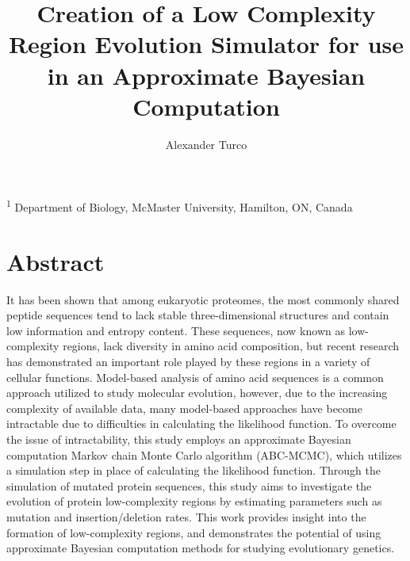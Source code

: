 \documentclass{article}
\title{\sc Creation of a Low Complexity Region Evolution Simulator for use in an Approximate Bayesian Computation}
\author{\sc Alexander Turco}
\begin{document}

\onecolumn
                        \maketitle

\thispagestyle{empty}
\noindent \textsuperscript{1} Department of Biology, McMaster University, Hamilton, ON, Canada

\newpage
\tableofcontents
\newpage
       
\section{Abstract} 

It has been shown that among eukaryotic proteomes, the most commonly shared peptide sequences tend to lack stable three-dimensional structures and contain low information and entropy content. These sequences, now known as low-complexity regions, lack diversity in amino acid composition, but recent research has demonstrated an important role played by these regions in a variety of cellular functions. Model-based analysis of amino acid sequences is a common approach utilized to study molecular evolution, however, due to the increasing complexity of available data, many model-based approaches have become intractable due to difficulties in calculating the likelihood function. To overcome the issue of intractability, this study employs an approximate Bayesian computation Markov chain Monte Carlo algorithm (ABC-MCMC), which utilizes a simulation step in place of calculating the likelihood function. Through the simulation of mutated protein sequences, this study aims to investigate the evolution of protein low-complexity regions by estimating parameters such as mutation and insertion/deletion rates. This work provides insight into the formation of low-complexity regions, and demonstrates the potential of using approximate Bayesian computation methods for studying evolutionary genetics. 

\bigskip
                        
                        
\end{document}
